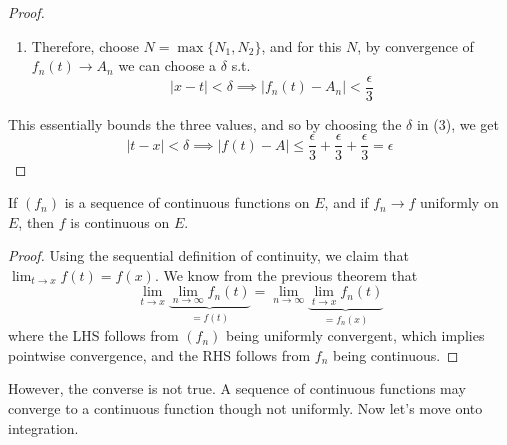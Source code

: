 \begin{proof}
\begin{enumerate}
      \item Therefore, choose $N = \max\{N_1, N_2\}$, and for this $N$, by convergence of $f_n (t) \to A_n$ we can choose a $\delta$ s.t. 
        \begin{equation}
          |x - t| < \delta \implies |f_n (t) - A_n| < \frac{\epsilon}{3} 
        \end{equation}
    \end{enumerate}
    This essentially bounds the three values, and so by choosing the $\delta$ in (3), we get 
    \begin{equation}
      |t - x| < \delta \implies |f(t) - A| \leq \frac{\epsilon}{3} + \frac{\epsilon}{3} + \frac{\epsilon}{3} = \epsilon
    \end{equation}
  \end{proof}

  \begin{corollary}
    If $(f_n)$ is a sequence of continuous functions on $E$, and if $f_n \to f$ uniformly on $E$, then $f$ is continuous on $E$. 
  \end{corollary}
  \begin{proof}
    Using the sequential definition of continuity, we claim that $\lim_{t \to x} f(t) = f(x)$. We know from the previous theorem that 
    \begin{equation}
      \lim_{t \to x} \underbrace{\lim_{n \to \infty} f_n (t)}_{= f(t)} = \lim_{n \to \infty} \underbrace{\lim_{t \to x} f_n (t)}_{= f_n (x)}
    \end{equation}
    where the LHS follows from $(f_n)$ being uniformly convergent, which implies pointwise convergence, and the RHS follows from $f_n$ being continuous.  
  \end{proof} 

  However, the converse is not true. A sequence of continuous functions may converge to a continuous function though not uniformly. Now let's move onto integration. 

